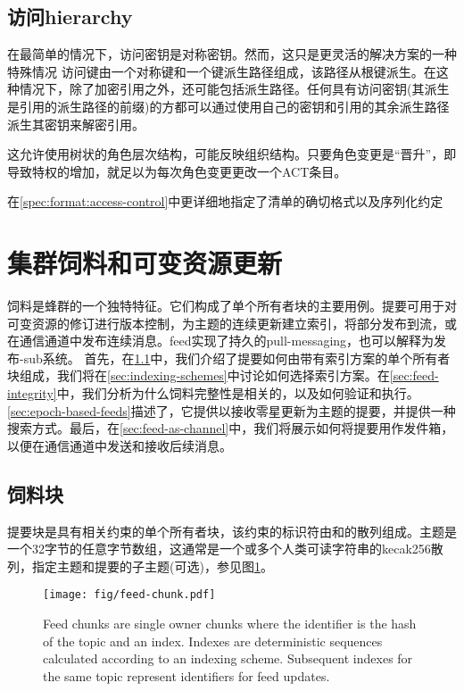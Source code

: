 \subsection{访问hierarchy\statusgreen}

在最简单的情况下，访问密钥是对称密钥。然而，这只是更灵活的解决方案的一种特殊情况
访问键由一个对称键和一个键派生路径组成，该路径从根键派生。在这种情况下，除了加密引用之外，还可能包括派生路径。任何具有访问密钥(其派生是引用的派生路径的前缀)的方都可以通过使用自己的密钥和引用的其余派生路径派生其密钥来解密引用。

这允许使用树状的角色层次结构，可能反映组织结构。只要角色变更是“晋升”，即导致特权的增加，就足以为每次角色变更更改一个ACT条目。

在\ref{spec:format:access-control}中更详细地指定了清单的确切格式以及序列化约定



\section{集群饲料和可变资源更新\statusyellow}\label{sec:feeds}

\green{}

饲料是蜂群的一个独特特征。它们构成了单个所有者块的主要用例。提要可用于对可变资源的修订进行版本控制，为主题的连续更新建立索引，将部分发布到流，或在通信通道中发布连续消息。feed实现了持久的pull-messaging，也可以解释为发布-sub系统。
首先，在\ref{sec:feed-chunks}中，我们介绍了提要如何由带有索引方案的单个所有者块组成，我们将在\ref{sec:indexing-schemes}中讨论如何选择索引方案。在\ref{sec:feed-integrity}中，我们分析为什么饲料完整性是相关的，以及如何验证和执行。\ref{sec:epoch-based-feeds}描述了，它提供以接收零星更新为主题的提要，并提供一种搜索方式。最后，在\ref{sec:feed-as-channel}中，我们将展示如何将提要用作发件箱，以便在通信通道中发送和接收后续消息。


\subsection{饲料块\statusyellow}\label{sec:feed-chunks}

提要块是具有相关约束的单个所有者块，该约束的标识符由和的散列组成。主题是一个32字节的任意字节数组，这通常是一个或多个人类可读字符串的kecak256散列，指定主题和提要的子主题(可选)，参见图\ref{fig:feed-chunk}。 


\begin{figure}[htbp]
\centering
\texttt{[image: fig/feed-chunk.pdf]}
\caption[Feed chunk \statusgreen]{Feed chunks are single owner chunks where the identifier is the hash of the topic and an index. Indexes are deterministic sequences calculated according to an indexing scheme. Subsequent indexes for the same topic represent identifiers for feed updates.}
\label{fig:feed-chunk}
\end{figure}

